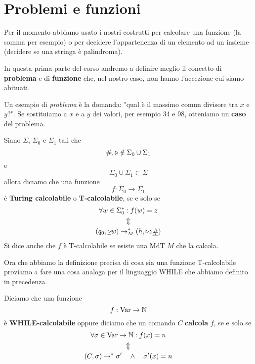 \section{Problemi e funzioni}
Per il momento abbiamo usato i nostri costrutti per calcolare
una funzione (la somma per esempio) o per decidere
l'appartenenza di un elemento ad un insieme (decidere se una
stringa è palindroma).

In questa prima parte del corso andremo a definire meglio il
concetto di \textbf{problema} e di \textbf{funzione} che, nel
nostro caso, non hanno l'accezione cui siamo abituati.

Un esempio di \emph{problema} è la domanda: "qual è il massimo
comun divisore tra $x$ e $y$?". Se sostituiamo a $x$ e a $y$
dei valori, per esempio 34 e 98, otteniamo un \textbf{caso}
del problema.

\begin{definition} \label{def: T-calcolabile}
	Siano $\Sigma$, $\Sigma_0$ e $\Sigma_1$ tali che
	\[ \#, \triangleright \notin \Sigma_0 \cup \Sigma_1 \]
	e
	\[ \Sigma_0 \cup \Sigma_1 \subset \Sigma \]
	allora diciamo che una funzione
	\[ f : \Sigma_0 \to \Sigma_1 \]
	è \textbf{Turing calcolabile} o \textbf{T-calcolabile},
	se e solo se
	\begin{gather*}
		\forall w \in \Sigma_0^* : f(w) = z \\
		\Updownarrow \\
		(q_0, \underline{\triangleright} w) \to_M^*
		(h, \triangleright z \underline{\#})
	\end{gather*}
	Si dice anche che $f$ è T-calcolabile se esiste una MdT
	$M$ che la calcola.
\end{definition}

Ora che abbiamo la definizione precisa di cosa sia una
funzione T-calcolabile proviamo a fare una cosa analoga per
il linguaggio WHILE che abbiamo definito in precedenza.

\begin{definition} \label{def: while-calcolabile}
	Diciamo che una funzione
	\[ f : \operatorname{Var} \to \mathbb{N} \]
	è \textbf{WHILE-calcolabile} oppure diciamo che un comando
	$C$ \textbf{calcola} $f$, se e solo se
	\begin{gather*}
		\forall \sigma \in \operatorname{Var} \to \mathbb{N} : f(x) = n \\
		\Updownarrow \\
		(C, \sigma) \to^* \sigma' \quad \land \quad
		\sigma'(x) = n
	\end{gather*}
\end{definition}

